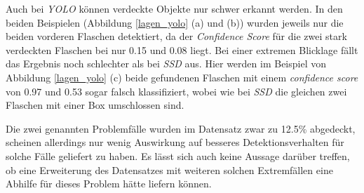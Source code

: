 Auch bei \textit{YOLO} können verdeckte Objekte nur schwer erkannt werden. In den beiden Beispielen (Abbildung \ref{lagen_yolo} (a) und (b)) wurden jeweils nur die beiden vorderen Flaschen detektiert, da der \textit{Confidence Score} für die zwei stark verdeckten Flaschen bei nur 0.15 und 0.08 liegt. Bei einer extremen Blicklage fällt das Ergebnis noch schlechter als bei \textit{SSD} aus. Hier werden im Beispiel von Abbildung \ref{lagen_yolo} (c) beide gefundenen Flaschen mit einem \textit{confidence score} von 0.97 und 0.53 sogar falsch klassifiziert, wobei wie bei \textit{SSD} die gleichen zwei Flaschen mit einer Box umschlossen sind.

Die zwei genannten Problemfälle wurden im Datensatz zwar zu 12.5\% abgedeckt, scheinen allerdings nur wenig Auswirkung auf besseres Detektionsverhalten für solche Fälle geliefert zu haben. Es lässt sich auch keine Aussage darüber treffen, ob eine Erweiterung des Datensatzes mit weiteren solchen Extremfällen eine Abhilfe für dieses Problem hätte liefern können. 

